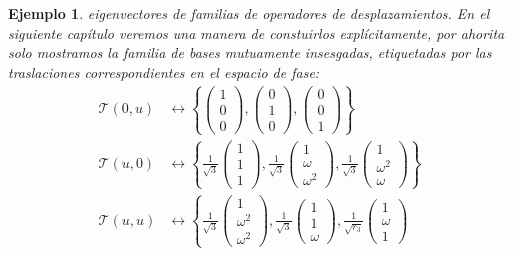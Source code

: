 \documentclass[a4paper]{report}
\newtheorem{example}{Ejemplo}
\begin{document}
\begin{example}
    eigenvectores de familias de operadores de
    desplazamientos. En el siguiente capítulo veremos una
    manera de constuirlos explícitamente, por ahorita solo
    mostramos la familia de bases mutuamente insesgadas,
    etiquetadas por las traslaciones correspondientes en el
    espacio de fase:
    \begin{align}
      \mathcal T(0,u)
      &\leftrightarrow \left\{
      \begin{pmatrix} 1\\0\\0 \end{pmatrix},
      \begin{pmatrix} 0\\1\\0 \end{pmatrix},
      \begin{pmatrix} 0\\0\\1 \end{pmatrix} 
      \right\} \\
      \mathcal T(u,0)
      &\leftrightarrow \left\{
        \frac{1}{\sqrt{3}}
        \begin{pmatrix} 1\\1\\1 \end{pmatrix},
        \frac{1}{\sqrt{3}}
        \begin{pmatrix} 1\\ \omega\\ \omega^2 \end{pmatrix},
        \frac{1}{\sqrt{3}}
        \begin{pmatrix} 1\\ \omega^2\\ \omega \end{pmatrix} 
      \right\} \\
      \mathcal T(u,u)
      &\leftrightarrow \left\{
        \frac{1}{\sqrt{3}}
        \begin{pmatrix} 1\\ \omega^2 \\ \omega^2
        \end{pmatrix},
        \frac{1}{\sqrt{3}}
        \begin{pmatrix} 1\\1\\ \omega \end{pmatrix},
        \frac{1}{\sqrt{r_3}}
        \begin{pmatrix} 1\\ \omega\\ 1 \end{pmatrix}

\end{align}
\end{example}
\end{document}

